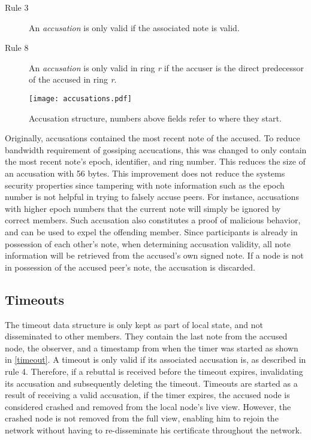 \documentclass[USenglish]{uit-thesis}
\begin{document}
\begin{description}
\item[Rule 3] An \textit{accusation} is only valid if the associated note is valid.
\item[Rule 8] An \textit{accusation} is only valid in ring \textit{r} if the accuser is the direct predecessor of the accused in ring \textit{r}.
\end{description} 

\begin{figure}[h]
	\centering
	\texttt{[image: accusations.pdf]}
	\caption{Accusation structure, numbers above fields refer to where they start.}
	\label{accu}
\end{figure}
Originally, accusations contained the most recent note of the accused.
To reduce bandwidth requirement of gossiping accucations, this was changed to only contain the most recent note's epoch, identifier, and ring number.
This reduces the size of an accusation with 56 bytes.
This improvement does not reduce the systems security properties since tampering with note information such as the epoch number is not helpful in trying to falsely accuse peers.
For instance, accusations with higher epoch numbers that the current note will simply be ignored by correct members. 
Such accusation also constitutes a proof of malicious behavior, and can be used to expel the offending member. 
Since participants is already in possession of each other's note, when determining accusation validity, all note information will be retrieved from the accused's own signed note. 
If a node is not in possession of the accused peer's note, the accusation is discarded.
  

\subsection{Timeouts}
The timeout data structure is only kept as part of local state, and not disseminated to other members. They contain the last note from the accused node, the observer, and a timestamp from when the timer was started as shown in \autoref{timeout}.
A timeout is only valid if its associated accusation is, as described in rule 4.
Therefore, if a rebuttal is received before the timeout expires, invalidating its accusation and subsequently deleting the timeout.
Timeouts are started as a result of receiving a valid accusation, if the timer expires, the accused node is considered crashed and removed from the local node's live view.
However, the crashed node is not removed from the full view, enabling him to rejoin the network without having to re-disseminate his certificate throughout the network.
\end{document}
